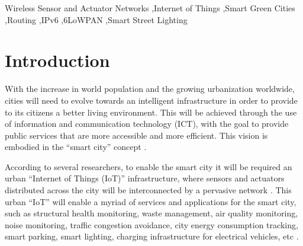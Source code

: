 \documentclass[final,authoryear,3p,twocolumn]{elsarticle}
\begin{document}
\begin{frontmatter}

%



\begin{keyword}
Wireless Sensor and Actuator Networks  \sep Internet of Things \sep Smart Green Cities \sep Routing \sep IPv6 \sep 6LoWPAN \sep Smart Street Lighting



\end{keyword}

\end{frontmatter}


\section{Introduction}

With  the increase in world population and the growing urbanization worldwide, cities will need to evolve towards an intelligent infrastructure in order to provide to its citizens a better living environment. This will be achieved through the use of information and communication technology (ICT), with the goal to provide public services that are more accessible and more efficient. This vision is embodied in the ``smart city'' concept \citep{Smart_City_2011, Smart_City_2013}. 

According to several researchers, to enable the smart city it will be required an urban ``Internet of Things (IoT)'' infrastructure, where sensors and actuators distributed across the city will be interconnected by a pervasive network \citep{Smart_City_IOT_2013,Smart_City_IOT_2014,Smart_City_IOT_2014b,Smart_City_IOT_2014c,Smart_City_IOT_2014d,
Smart_City_IOT_2014e}. 
This urban ``IoT'' will enable a myriad of services and applications for the smart city, such as structural health monitoring, waste management, air quality monitoring, noise monitoring, traffic congestion avoidance, city energy consumption tracking, smart parking, smart lighting, charging infrastructure for electrical vehicles, etc \citep{Smart_City_2011, Smart_City_2013}.
\end{document}
